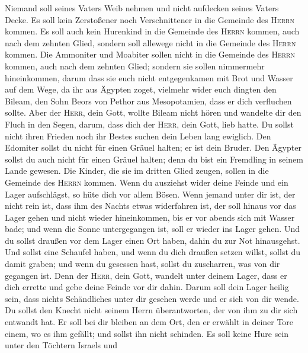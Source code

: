  Niemand soll seines Vaters Weib nehmen und nicht
aufdecken seines Vaters Decke.  Es soll kein Zerstoßener
noch Verschnittener in die Gemeinde des \textsc{Herrn} kommen.
 Es soll auch kein Hurenkind in die Gemeinde des
\textsc{Herrn} kommen, auch nach dem zehnten Glied, sondern soll
allewege nicht in die Gemeinde des \textsc{Herrn} kommen. 
Die Ammoniter und Moabiter sollen nicht in die Gemeinde des
\textsc{Herrn} kommen, auch nach dem zehnten Glied; sondern sie sollen
nimmermehr hineinkommen,  darum dass sie euch nicht
entgegenkamen mit Brot und Wasser auf dem Wege, da ihr aus Ägypten
zoget, vielmehr wider euch dingten den Bileam, den Sohn Beors von Pethor
aus Mesopotamien, dass er dich verfluchen sollte.  Aber
der \textsc{Herr}, dein Gott, wollte Bileam nicht hören und wandelte dir
den Fluch in den Segen, darum, dass dich der \textsc{Herr}, dein Gott,
lieb hatte.  Du sollst nicht ihren Frieden noch ihr Bestes
suchen dein Leben lang ewiglich.  Den Edomiter sollst du
nicht für einen Gräuel halten; er ist dein Bruder. Den Ägypter sollst du
auch nicht für einen Gräuel halten; denn du bist ein Fremdling in seinem
Lande gewesen.  Die Kinder, die sie im dritten Glied
zeugen, sollen in die Gemeinde des \textsc{Herrn} kommen.
 Wenn du ausziehst wider deine Feinde und ein Lager
aufschlägst, so hüte dich vor allem Bösen.  Wenn jemand
unter dir ist, der nicht rein ist, dass ihm des Nachts etwas widerfahren
ist, der soll hinaus vor das Lager gehen und nicht wieder hineinkommen,
 bis er vor abends sich mit Wasser bade; und wenn die
Sonne untergegangen ist, soll er wieder ins Lager gehen. 
Und du sollst draußen vor dem Lager einen Ort haben, dahin du zur Not
hinausgehst.  Und sollst eine Schaufel haben, und wenn du
dich draußen setzen willst, sollst du damit graben; und wenn du gesessen
hast, sollst du zuscharren, was von dir gegangen ist. 
Denn der \textsc{Herr}, dein Gott, wandelt unter deinem Lager, dass er
dich errette und gebe deine Feinde vor dir dahin. Darum soll dein Lager
heilig sein, dass nichts Schändliches unter dir gesehen werde und er
sich von dir wende.  Du sollst den Knecht nicht seinem
Herrn überantworten, der von ihm zu dir sich entwandt hat.
 Er soll bei dir bleiben an dem Ort, den er erwählt in
deiner Tore einem, wo es ihm gefällt; und sollst ihn nicht schinden.
 Es soll keine Hure sein unter den Töchtern Israels und
